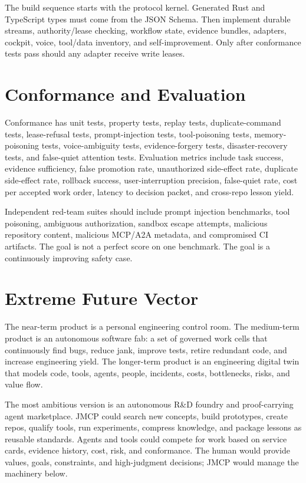 \documentclass[10pt,journal,onecolumn]{IEEEtran}
\begin{document}
The build sequence starts with the protocol kernel. Generated Rust and TypeScript types must come from the JSON Schema. Then implement durable streams, authority/lease checking, workflow state, evidence bundles, adapters, cockpit, voice, tool/data inventory, and self-improvement. Only after conformance tests pass should any adapter receive write leases.

\section{Conformance and Evaluation}
Conformance has unit tests, property tests, replay tests, duplicate-command tests, lease-refusal tests, prompt-injection tests, tool-poisoning tests, memory-poisoning tests, voice-ambiguity tests, evidence-forgery tests, disaster-recovery tests, and false-quiet attention tests. Evaluation metrics include task success, evidence sufficiency, false promotion rate, unauthorized side-effect rate, duplicate side-effect rate, rollback success, user-interruption precision, false-quiet rate, cost per accepted work order, latency to decision packet, and cross-repo lesson yield.

Independent red-team suites should include prompt injection benchmarks, tool poisoning, ambiguous authorization, sandbox escape attempts, malicious repository content, malicious MCP/A2A metadata, and compromised CI artifacts. The goal is not a perfect score on one benchmark. The goal is a continuously improving safety case.

\section{Extreme Future Vector}
The near-term product is a personal engineering control room. The medium-term product is an autonomous software fab: a set of governed work cells that continuously find bugs, reduce jank, improve tests, retire redundant code, and increase engineering yield. The longer-term product is an engineering digital twin that models code, tools, agents, people, incidents, costs, bottlenecks, risks, and value flow.

The most ambitious version is an autonomous R\&D foundry and proof-carrying agent marketplace. JMCP could search new concepts, build prototypes, create repos, qualify tools, run experiments, compress knowledge, and package lessons as reusable standards. Agents and tools could compete for work based on service cards, evidence history, cost, risk, and conformance. The human would provide values, goals, constraints, and high-judgment decisions; JMCP would manage the machinery below.
\end{document}
